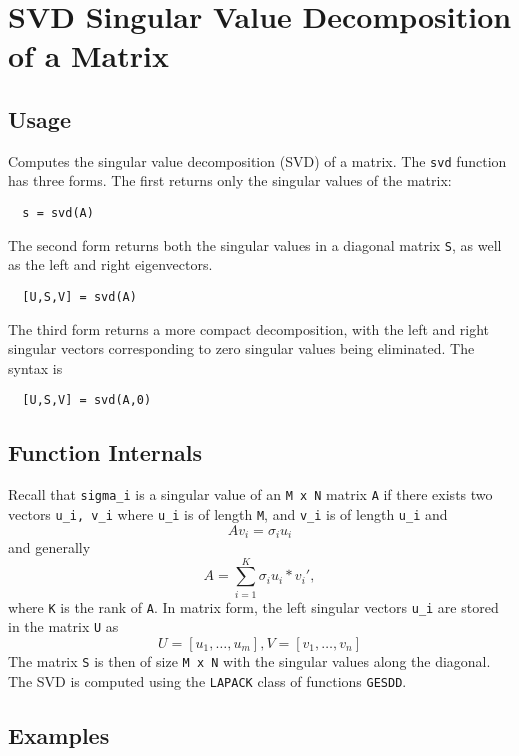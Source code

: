 \section{SVD Singular Value Decomposition of a Matrix}

\subsection{Usage}

Computes the singular value decomposition (SVD) of a matrix.  The 
\verb|svd| function has three forms.  The first returns only the singular
values of the matrix:
\begin{verbatim}
  s = svd(A)
\end{verbatim}
The second form returns both the singular values in a diagonal
matrix \verb|S|, as well as the left and right eigenvectors.
\begin{verbatim}
  [U,S,V] = svd(A)
\end{verbatim}
The third form returns a more compact decomposition, with the
left and right singular vectors corresponding to zero singular
values being eliminated.  The syntax is
\begin{verbatim}
  [U,S,V] = svd(A,0)
\end{verbatim}
\subsection{Function Internals}

Recall that \verb|sigma_i| is a singular value of an \verb|M x N|
matrix \verb|A| if there exists two vectors \verb|u_i, v_i| where \verb|u_i| is
of length \verb|M|, and \verb|v_i| is of length \verb|u_i| and
\[
  A v_i = \sigma_i u_i
\]
and generally
\[
  A = \sum_{i=1}^{K} \sigma_i u_i*v_i',
\]
where \verb|K| is the rank of \verb|A|.  In matrix form, the left singular
vectors \verb|u_i| are stored in the matrix \verb|U| as
\[
  U = [u_1,\ldots,u_m], V = [v_1,\ldots,v_n]
\]
The matrix \verb|S| is then of size \verb|M x N| with the singular
values along the diagonal.  The SVD is computed using the 
\verb|LAPACK| class of functions \verb|GESDD|.
\subsection{Examples}

